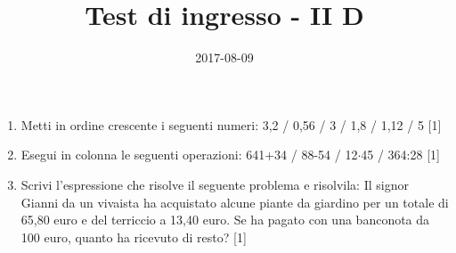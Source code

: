 \documentclass[11pt,fleqn]{article} %
\title{Test di ingresso - II D}
\date{2017-08-09}
\newcommand{\T}{\cdot}
\begin{document}
\maketitle
\begin{enumerate}

\item Metti in ordine crescente i seguenti numeri: 3,2 / 0,56 / 3 / 1,8 / 1,12 / 5 [1] 
\item Esegui in colonna le seguenti operazioni: 641+34 / 88-54 / 12$\T$45 / 364:28 [1] 
\item Scrivi l'espressione che risolve il seguente problema e risolvila: Il signor Gianni da un vivaista ha acquistato alcune piante da giardino per un totale di 65,80 euro e del terriccio a 13,40 euro. Se ha pagato con una banconota da 100 euro, quanto ha ricevuto di resto? [1] 
\end{enumerate}
\end{document}
